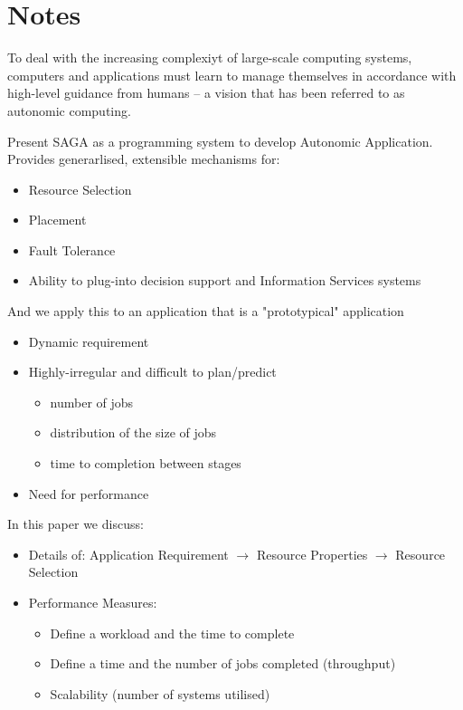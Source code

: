\documentclass[conference,final]{IEEEtran}
\begin{document}
\section*{Notes}
To deal with the increasing complexiyt of large-scale computing
systems, computers and applications must learn to manage themselves in
accordance with high-level guidance from humans -- a vision that has
been referred to as autonomic computing.

Present SAGA as a programming system to develop Autonomic Application.
Provides generarlised, extensible mechanisms  for:
\begin{itemize}
\item  Resource Selection
\item  Placement
\item  Fault Tolerance
\item  Ability to plug-into decision support and Information Services systems
\end{itemize}

And we apply this to an application that is a "prototypical"
application

\begin{itemize} 
\item Dynamic requirement
\item Highly-irregular and  difficult to plan/predict
\begin{itemize} 
  \item  number of jobs
  \item distribution of the size of jobs
  \item time to completion between stages
\end{itemize} 
\item Need for performance 
\end{itemize} 

In this paper we discuss:
\begin{itemize} 
\item Details of: Application Requirement $\rightarrow$ Resource Properties 
$\rightarrow$ Resource Selection
\item Performance Measures:
  \begin{itemize}
\item Define a workload and the time to complete 
\item  Define a time and the number of jobs completed (throughput)
\item Scalability (number of systems utilised)
\end{itemize} 
\end{itemize} 
\end{document}
